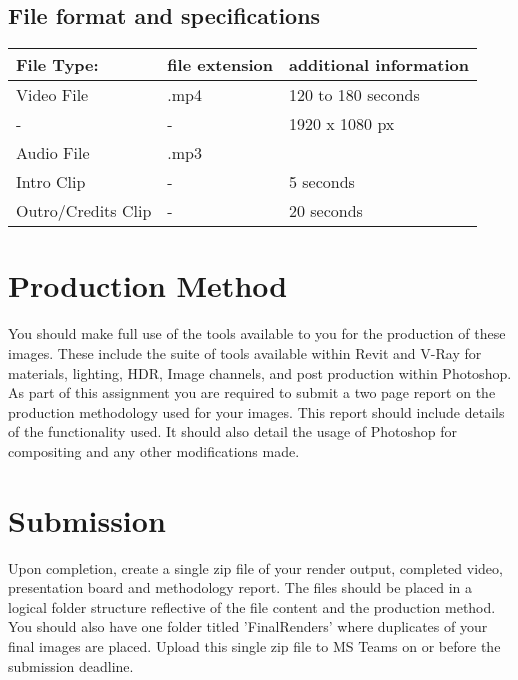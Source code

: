 \subsection*{File format and specifications}

\begin{tabularx}{\textwidth}{ |X|X|X| }
	\hline
	\textbf{File Type:} & file extension & additional information\\
	\hline 
	Video File  & .mp4 & 120 to 180 seconds \\
	- & - & 1920 x 1080 px \\
	Audio File & .mp3 & \\
	Intro Clip & - & 5 seconds\\
	Outro/Credits Clip & - & 20 seconds\\
	\hline
\end{tabularx}









\section*{Production Method}

You should make full use of the tools available to you for the production of these images.  These include the suite of tools available within Revit and V-Ray for materials, lighting, HDR, Image channels, and post production within Photoshop.\\

As part of this assignment you are required to submit a two page report on the production methodology used for your images.  This report should include details of the functionality used. It should also detail the usage of Photoshop for compositing and any other modifications made. \\




\section*{Submission}
Upon completion, create a single zip file of your render output, completed video, presentation board and methodology report.  The files should be placed in a logical folder structure reflective of the file content and the production method.  You should also have one folder titled 'FinalRenders' where duplicates of your final images are placed.  Upload this single zip file to MS Teams on or before the submission deadline.

